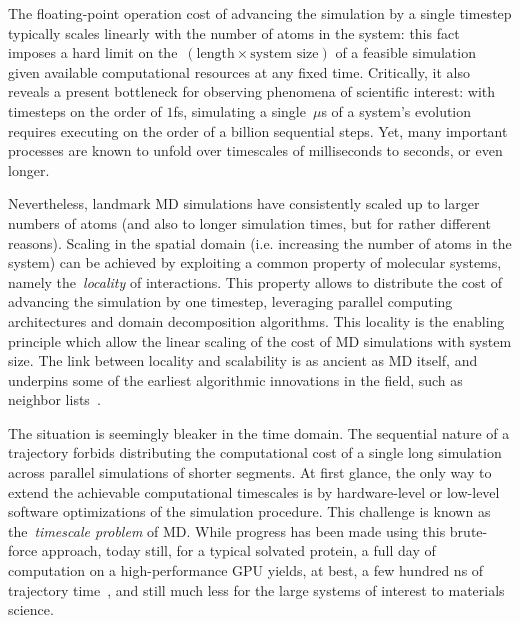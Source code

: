 The floating-point operation cost of advancing the simulation by a single timestep typically scales linearly with the number of atoms in the system: this fact imposes a hard limit on the~$(\text{length}\times\text{system size})$ of a feasible simulation given available computational resources at any fixed time.
Critically, it also reveals a present bottleneck for observing phenomena of scientific interest: with timesteps on the order of $1$fs, simulating a single~$\mu$s of a system's evolution requires executing on the order of a billion sequential steps. Yet, many important processes are known to unfold over timescales of milliseconds to seconds, or even longer.

Nevertheless, landmark MD simulations have consistently scaled up to larger numbers of atoms (and also to longer simulation times, but for rather different reasons). 
Scaling in the spatial domain (i.e. increasing the number of atoms in the system) can be achieved by exploiting a common property of molecular systems, namely the~\textit{locality} of interactions. This property allows to distribute the cost of advancing the simulation by one timestep, leveraging parallel computing architectures and domain decomposition algorithms.
This locality is the enabling principle which allow the linear scaling of the cost of MD simulations with system size. The link between locality and scalability is as ancient as MD itself, and underpins some of the earliest algorithmic innovations in the field, such as neighbor lists~\cite{V67}.

The situation is seemingly bleaker in the time domain. The sequential nature of a trajectory forbids distributing the computational cost of a single long simulation across parallel simulations of shorter segments. At first glance, the only way to extend the achievable computational timescales is by hardware-level or low-level software optimizations of the simulation procedure.
This challenge is known as the~\textit{timescale problem} of MD. While progress has been made using this brute-force approach, today still, for a typical solvated protein, a full day of computation on a high-performance GPU yields, at best, a few hundred ns of trajectory time~\cite{HD18}, and still much less for the large systems of interest to materials science.

